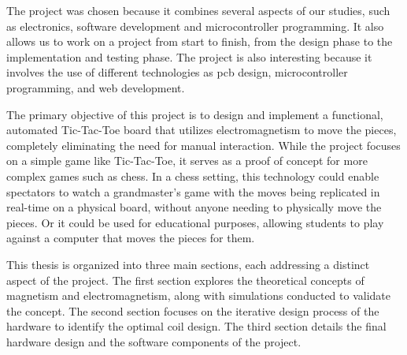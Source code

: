 The project was chosen because it combines several aspects of our studies, such as electronics, software development and microcontroller programming. It also allows us to work on a project from start to finish, from the design phase to the implementation and testing phase. The project is also interesting because it involves the use of different technologies as \gls{pcb} design, microcontroller programming, and web development.

The primary objective of this project is to design and implement a functional, automated Tic-Tac-Toe board that utilizes electromagnetism to move the pieces, completely eliminating the need for manual interaction. While the project focuses on a simple game like Tic-Tac-Toe, it serves as a proof of concept for more complex games such as chess. In a chess setting, this technology could enable spectators to watch a grandmaster's game with the moves being replicated in real-time on a physical board, without anyone needing to physically move the pieces. Or it could be used for educational purposes, allowing students to play against a computer that moves the pieces for them.

This thesis is organized into three main sections, each addressing a distinct aspect of the project. The first section explores the theoretical concepts of magnetism and electromagnetism, along with simulations conducted to validate the concept. The second section focuses on the iterative design process of the hardware to identify the optimal coil design. The third section details the final hardware design and the software components of the project.